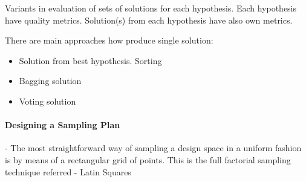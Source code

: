     Variants in evaluation of sets of solutions for each hypothesis.
    Each hypothesis have quality metrics. Solution(s) from each hypothesis have also own metrics.

    There are main approaches how produce single solution: 
    \begin{itemize}
        \item Solution from best hypothesis. Sorting
        \item Bagging solution
        \item Voting solution                
    \end{itemize}

    \paragraph{Designing a Sampling Plan}
     - The most straightforward way of sampling a design space in a uniform fashion is by \cite{EngSurMod}
     means of a rectangular grid of points. This is the full factorial sampling technique referred
     - Latin Squares